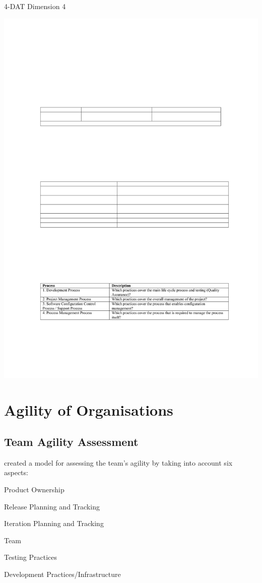 \begin{table}[H]
\caption{4-DAT Dimension 4}
\label{fig:dimension4}
\centerline{\includegraphics[scale=0.8]{include/relatedwork/fig/qumer_dimension4.pdf}}
\end{table}

\section{Agility of Organisations}

\subsection{Team Agility Assessment} %
\citet{Leffingwell} created a model for assessing the team's agility by taking into account six aspects: 
\begin{inparaenum} [a\upshape)]
\item Product Ownership
\item Release Planning and Tracking
\item Iteration Planning and Tracking
\item Team
\item Testing Practices
\item Development Practices/Infrastructure
\end{inparaenum}

